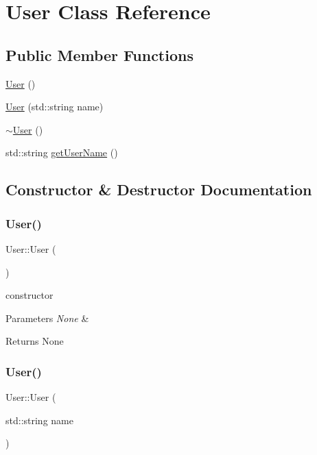 \hypertarget{class_user}{}\section{User Class Reference}
\label{class_user}
\subsection*{Public Member Functions}
\begin{DoxyCompactItemize}
\item 
\mbox{\hyperlink{class_user_a4a0137053e591fbb79d9057dd7d2283d}{User}} ()
\item 
\mbox{\hyperlink{class_user_af9e5f33114c8330be7b91276b7377e6d}{User}} (std\+::string name)
\item 
\mbox{\hyperlink{class_user_ac00b72ad64eb4149f7b21b9f5468c2b2}{$\sim$\+User}} ()
\item 
std\+::string \mbox{\hyperlink{class_user_a3fcf5814ba0a2415862c892746585a46}{get\+User\+Name}} ()
\end{DoxyCompactItemize}


\subsection{Constructor \& Destructor Documentation}
\mbox{\label{class_user_a4a0137053e591fbb79d9057dd7d2283d}} 
\subsubsection{\texorpdfstring{User()}{User()}\hspace{0.1cm}{\footnotesize\ttfamily [1/2]}}
{\footnotesize\ttfamily User\+::\+User (\begin{DoxyParamCaption}{ }\end{DoxyParamCaption})}

constructor 
\begin{DoxyParams}{Parameters}
{\em None} & \\
\hline
\end{DoxyParams}
\begin{DoxyReturn}{Returns}
None 
\end{DoxyReturn}
\mbox{\label{class_user_af9e5f33114c8330be7b91276b7377e6d}} 
\subsubsection{\texorpdfstring{User()}{User()}\hspace{0.1cm}{\footnotesize\ttfamily [2/2]}}
{\footnotesize\ttfamily User\+::\+User (\begin{DoxyParamCaption}\item[{std\+::string}]{name }\end{DoxyParamCaption})}

